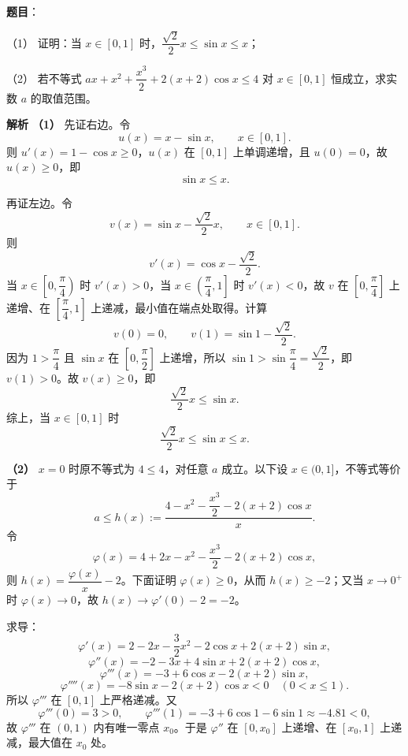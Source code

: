 \begin{answer}

\textbf{题目}：

（1） 证明：当 $x\in[0,1]$ 时，$\dfrac{\sqrt2}2x\leqslant\sin x\leqslant x$；

（2） 若不等式 $ax+x^2+\dfrac{x^3}2+2(x+2)\cos x\leqslant4$ 对 $x\in[0,1]$ 恒成立，求实数 $a$ 的取值范围。

\textbf{解析}
\textbf{（1）} 先证右边。令
\nopagebreak[4]
\[u(x)=x-\sin x,\qquad x\in[0,1].\]
则 $u'(x)=1-\cos x\geqslant0$，$u(x)$ 在 $[0,1]$ 上单调递增，且 $u(0)=0$，故 $u(x)\geqslant0$，即
\nopagebreak[4]
\[\sin x\leqslant x.\]

再证左边。令
\nopagebreak[4]
\[v(x)=\sin x-\frac{\sqrt2}2x,\qquad x\in[0,1].\]
则
\nopagebreak[4]
\[v'(x)=\cos x-\frac{\sqrt2}2.\]
当 $x\in\left[0,\dfrac\pi4\right)$ 时 $v'(x)>0$，当 $x\in\left(\dfrac\pi4,1\right]$ 时 $v'(x)<0$，故 $v$ 在 $\left[0,\dfrac\pi4\right]$ 上递增、在 $\left[\dfrac\pi4,1\right]$ 上递减，最小值在端点处取得。计算
\nopagebreak[4]
\[v(0)=0,\qquad v(1)=\sin1-\frac{\sqrt2}2.\]
因为 $1>\dfrac\pi4$ 且 $\sin x$ 在 $\left[0,\dfrac\pi2\right]$ 上递增，所以 $\sin1>\sin\dfrac\pi4=\dfrac{\sqrt2}2$，即 $v(1)>0$。故 $v(x)\geqslant0$，即
\nopagebreak[4]
\[\frac{\sqrt2}2x\leqslant\sin x.\]
综上，当 $x\in[0,1]$ 时
\nopagebreak[4]
\[\frac{\sqrt2}2x\leqslant\sin x\leqslant x.\]

\textbf{（2）} $x=0$ 时原不等式为 $4\leqslant4$，对任意 $a$ 成立。以下设 $x\in(0,1]$，不等式等价于
\nopagebreak[4]
\[a\leqslant h(x):=\frac{4-x^2-\dfrac{x^3}2-2(x+2)\cos x}{x}.\]
令
\nopagebreak[4]
\[\varphi(x)=4+2x-x^2-\frac{x^3}2-2(x+2)\cos x,\]
则 $h(x)=\dfrac{\varphi(x)}x-2$。下面证明 $\varphi(x)\geqslant0$，从而 $h(x)\geqslant-2$；又当 $x\to0^+$ 时 $\varphi(x)\to0$，故 $h(x)\to\varphi'(0)-2=-2$。

求导：
\nopagebreak[4]
\[\varphi'(x)=2-2x-\frac32x^2-2\cos x+2(x+2)\sin x,\]
\nopagebreak[4]
\[\varphi''(x)=-2-3x+4\sin x+2(x+2)\cos x,\]
\nopagebreak[4]
\[\varphi'''(x)=-3+6\cos x-2(x+2)\sin x,\]
\nopagebreak[4]
\[\varphi''''(x)=-8\sin x-2(x+2)\cos x<0\quad(0<x\leqslant1).\]
所以 $\varphi'''$ 在 $[0,1]$ 上严格递减。又
\nopagebreak[4]
\[\varphi'''(0)=3>0,\qquad \varphi'''(1)=-3+6\cos1-6\sin1\approx-4.81<0,\]
故 $\varphi'''$ 在 $(0,1)$ 内有唯一零点 $x_0$。于是 $\varphi''$ 在 $[0,x_0]$ 上递增、在 $[x_0,1]$ 上递减，最大值在 $x_0$ 处。


\end{answer}
